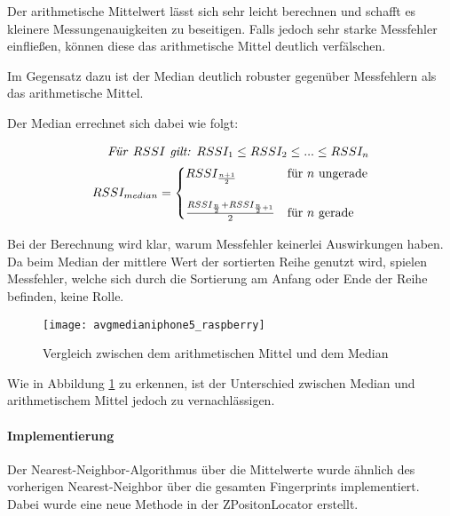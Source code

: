 Der arithmetische Mittelwert lässt sich sehr leicht berechnen und schafft es kleinere Messungenauigkeiten zu beseitigen. Falls jedoch sehr starke Messfehler einfließen, können diese das arithmetische Mittel deutlich verfälschen.

Im Gegensatz dazu ist der Median deutlich robuster gegenüber Messfehlern als das arithmetische Mittel.

Der Median errechnet sich dabei wie folgt: 

\begin{equation}
	\begin{split}
	\text{\emph{Für }}RSSI \text{\emph{ gilt: }} RSSI_{1} \leq RSSI_{2} \leq ... \leq RSSI_{n} \\
	RSSI_{median}=\begin{cases}
	RSSI_{\frac{n+1}{2}} & \text{für } n \text{ ungerade}\\ \\
	\frac{RSSI_{\frac{n}{2}} + RSSI_{\frac{n}{2}+1}}{2} & \text{für } n \text{ gerade} \\
	\end{cases}
	\end{split}
\end{equation}

Bei der Berechnung wird klar, warum Messfehler keinerlei Auswirkungen haben. Da beim Median der mittlere Wert der sortierten Reihe genutzt wird, spielen Messfehler, welche sich durch die Sortierung am Anfang oder Ende der Reihe befinden, keine Rolle.

\begin{figure}[htb!]
		\centering
	\texttt{[image: avgmedianiphone5\_raspberry]}
	\caption{Vergleich zwischen dem arithmetischen Mittel und dem Median}
	\label{avgmedianiphone5_raspberry}
\end{figure}

Wie in Abbildung \ref{avgmedianiphone5_raspberry} zu erkennen, ist der Unterschied zwischen Median und arithmetischem Mittel jedoch zu vernachlässigen. 

\paragraph{Implementierung}
\label{sec:implementation:fingerprinting:positioning:avg:implementiation}
Der Nearest-Neighbor-Algorithmus über die Mittelwerte wurde ähnlich des vorherigen Nearest-Neighbor über die gesamten Fingerprints implementiert. Dabei wurde eine neue Methode in der ZPositonLocator erstellt.


